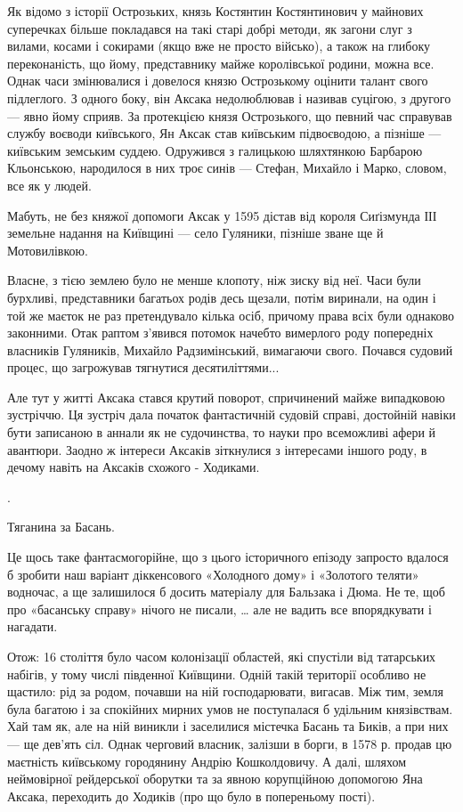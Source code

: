 
Як відомо з історії Острозьких, князь Костянтин Костянтинович у майнових
суперечках більше покладався на такі старі добрі методи, як загони слуг з
вилами, косами і сокирами (якщо вже не просто військо), а також на глибоку
переконаність, що йому, представнику майже королівської родини, можна все.
Однак часи змінювалися і довелося князю Острозькому оцінити талант свого
підлеглого. З одного боку, він Аксака недолюблював і називав суцігою, з другого
— явно йому сприяв. За протекцією князя Острозького, що певний час справував
службу воєводи київського, Ян Аксак став київським підвоєводою, а пізніше —
київським земським суддею. Одружився з галицькою шляхтянкою Барбарою
Кльонською, народилося в них троє синів — Стефан, Михайло і Марко, словом, все
як у людей.

Мабуть, не без княжої допомоги Аксак у 1595 дістав від короля Сиґізмунда ІІІ
земельне надання на Київщині — село Гуляники, пізніше зване ще й Мотовилівкою.

Власне, з тією землею було не менше клопоту, ніж зиску від неї. Часи були
бурхливі, представники багатьох родів десь щезали, потім виринали, на один і
той же маєток не раз претендувало кілька осіб, причому права всіх були однаково
законними. Отак раптом з’явився потомок начебто вимерлого роду попередніх
власників Гуляників, Михайло Радзимінський, вимагаючи свого. Почався судовий
процес, що загрожував тягнутися десятиліттями...

Але тут у житті Аксака стався крутий поворот, спричинений майже випадковою
зустріччю. Ця зустріч дала початок фантастичній судовій справі, достойній
навіки бути записаною в аннали як не судочинства, то науки про всеможливі афери
й авантюри. Заодно ж інтереси Аксаків зіткнулися з інтересами іншого роду, в
дечому навіть на Аксаків схожого - Ходиками.

.

Тяганина за Басань.

Це щось таке фантасмогорійне, що з цього історичного епізоду запросто вдалося б
зробити наш варіант діккенсового «Холодного дому» і «Золотого теляти» водночас,
а ще залишилося б досить матеріалу для Бальзака і Дюма. Не те, щоб про
«басанську справу» нічого не писали, … але не вадить все впорядкувати і
нагадати. 

Отож: 16 століття було часом колонізації областей, які спустіли від татарських
набігів, у тому числі південної Київщини. Одній такій території особливо не
щастило: рід за родом, почавши на ній господарювати, вигасав. Між тим, земля
була багатою і за спокійних мирних умов не поступалася б удільним князівствам.
Хай там як, але на ній виникли і заселилися містечка Басань та Биків, а при них
— ще дев’ять сіл. Однак черговий власник, залізши в борги, в 1578 р. продав цю
маєтність київському городянину Андрію Кошколдовичу. А далі, шляхом неймовірної
рейдерської оборутки та за явною корупційною допомогою Яна Аксака, переходить
до Ходиків (про що було в попереньому пості).

